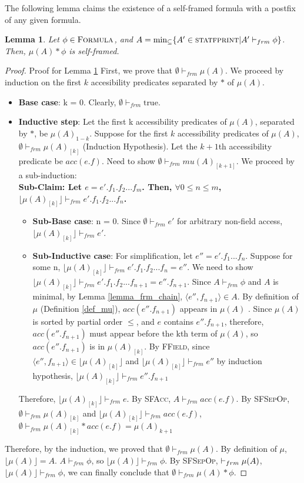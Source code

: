 \documentclass {article}
\newtheorem{lemma}[theorem]{Lemma}
\newcommand{\true}{\text{true}}
\newcommand{\frm}{\vdash_{frm}}
\newcommand{\formula}{\textsc{Formula}}
\begin{document}
The following lemma claims the existence of a self-framed formula with a postfix of any given formula.\\
\begin{lemma}
\label{lemma_mu}
Let $\phi \in \formula$, and $A = \min_{\subseteq}\{A' \in \textsc{statfprint} | A' \frm \phi\}$. Then, $\mu(A) \ast \phi$ is self-framed.
\end{lemma}
\begin{proof} Proof for Lemma \ref{lemma_mu}
First, we prove that $\emptyset \frm \mu(A)$. We proceed by induction on the first $k$ accesibility predicates separated by $\ast$ of $\mu(A)$.
\begin{itemize}
	\item \textbf{Base case}: k = 0. Clearly, $\emptyset \frm \true$.
	\item \textbf{Inductive step}: Let the first k accessibility predicates of $\mu(A)$, separated by $\ast$, be $\mu(A)_{1-k}$. Suppose for the first $k$ accessibility predicates of $\mu(A)$, $\emptyset \frm \mu(A)_{[k]}$ (Induction Hypothesis). Let the $k+1$th accessibility predicate be $acc(e.f)$. Need to show $\emptyset \frm mu(A)_{[k+1]}$. We proceed by a sub-induction:\\
	\textbf{Sub-Claim: Let $e = e'.f_1.f_2...f_m$. Then, $\forall 0 \leqslant n \leqslant m$, $\lfloor \mu(A)_{[k]} \rfloor \frm e'.f_1.f_2...f_n$.}
	\begin{itemize}
		\item \textbf{Sub-Base case}: n = 0. Since $\emptyset \frm e'$ for arbitrary non-field access, $\lfloor \mu(A)_{[k]} \rfloor \frm e'$.
		\item\textbf{ Sub-Inductive case}: For simplification, let $e'' = e'.f_1...f_n$. Suppose for some n, $\lfloor \mu(A)_{[k]} \rfloor \frm e'.f_1.f_2...f_n = e''$.  We need to show $\lfloor \mu(A)_{[k]} \rfloor \frm e'.f_1.f_2...f_{n+1} = e''.f_{n+1}$.  Since $A \frm \phi$ and $A$ is minimal, by Lemma \ref{lemma_frm_chain}, $\langle e'',f_{n+1} \rangle \in A$. By definition of $\mu$ (Definition \ref{def_mu}), $acc(e''.f_{n+1})$ appears in $\mu(A)$ . Since $\mu(A)$ is sorted by partial order $\leq$, and $e$ contains $e''.f_{n+1}$, therefore, $acc(e''.f_{n+1})$ must appear before the kth term of $\mu(A)$, so $acc(e''.f_{n+1})$ is in $\mu(A)_{[k]}$. By \textsc{FField}, since $\langle e'',f_{n+1}\rangle \in \lfloor \mu(A)_{[k]} \rfloor$ and $\lfloor \mu(A)_{[k]} \rfloor \frm e''$ by induction hypothesis, $\lfloor \mu(A)_{[k]} \rfloor \frm e''.f_{n+1}$
	\end{itemize}
	Therefore, $\lfloor \mu(A)_{[k]} \rfloor \frm e$. By \textsc{SFAcc}, $A \frm acc(e.f)$. By \textsc{SFSepOp}, $\emptyset \frm \mu(A)_{[k]}$ and $\lfloor \mu(A)_{[k]} \rfloor \frm acc(e.f)$, $\emptyset \frm \mu(A)_{[k]} \ast acc(e.f) = \mu(A)_{k+1}$
\end{itemize}
Therefore, by the induction, we proved that $\emptyset \frm \mu(A)$. By definition of $\mu$, $\lfloor \mu(A) \rfloor = A$. $A \frm \phi$, so $\lfloor \mu(A) \rfloor \frm \phi$. By \textsc{SFSepOp}, $\empty \frm \mu(A)$, $\lfloor \mu(A) \rfloor \frm \phi$, we can finally conclude that $\emptyset \frm \mu(A) \ast \phi$.
\end{proof}
\end{document}

